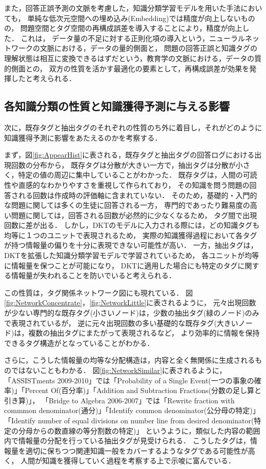 また，回答正誤予測の文脈を考慮した，知識分類学習モデルを用いた手法においても，
単純な低次元空間への埋め込み(Embedding)では精度が向上しないものの，
問題空間とタグ空間の再構成誤差を導入することにより，精度が向上した．
これは，
データ量の不足に対する正則化項の導入という，ニューラルネットワークの文脈における，データの量的側面と，
問題の回答正誤と知識タグの理解状態は相互に変換できるはずだという，教育学の文脈における，データの質的側面との，
双方の性質を活かす最適化の要素として，再構成誤差が効果を発揮したと考えられる．



\subsection{各知識分類の性質と知識獲得予測に与える影響}
次に，既存タグと抽出タグのそれぞれの性質のち外に着目し，それがどのように知識獲得予測に影響をあたえるのかを考察する．

まず，図\ref{fig:AppearHist}に表される，既存タグと抽出タグの回答ログにおける出現回数の分布から，
既存タグは分散が大きい一方で，抽出タグは分散が小さく，特定の値の周辺に集中していることがわかった．
既存タグは，人間の可読性や直感的なわかりやすさを重視して作られており，
その知識を問う問題の回答される回数は作成時の評価軸に含まれていない．
そのため，基礎的・入門的な問題に関しては多くの生徒に回答される一方，
専門的であったり難易度の高い問題に関しては，回答される回数が必然的に少なくなるため，
タグ間で出現回数に差が出る．
しかし，DKTのモデルに入力される際には，どの知識タグも均等に１つのユニットで表現されるため，
実際の知識獲得過程において各タグが持つ情報量の偏りを十分に表現できない可能性が高い．
一方，抽出タグは，DKTを拡張した知識分類学習モデルで学習されているため，
各ユニットが均等に情報量を保つことが可能になり，
DKTに適用した場合にも特定のタグに関する情報量が失われることを防いでいると考えられる．

この性質は，タグ関係ネットワーク図にも現れている．
図\ref{fig:NetworkConcentrate}，\ref{fig:NetworkLittle}に表されるように，
元々出現回数が少ない専門的な既存タグ(小さいノード)は，少数の抽出タグ(緑のノード)のみで表現されているが，
逆に元々出現回数の多い基礎的な既存タグ(大きいノード)は，複数の抽出タグにまたがって表現されるなど，
より効率的に情報を保持できるタグ構造がとなっていることがわかる．

さらに，こうした情報量の均等な分配構造は，内容と全く無関係に生成されるものではないこともわかる．
図\ref{fig:NetworkSimilar}に表されるように，
「ASSISTments 2009-2010」では「Probability of a Single Event(一つの事象の確率)」「Percent Of(百分率)」「Addition and Subtraction Fractions(分数の足し算と引き算)」，
「Bridge to Algebra 2006-2007」では「Rewrite fraction with commmon denominator(通分)」「Identify common denominator(公分母の特定)」「Identify number of equal divisions on number line from desired denominator(特定の分母からの数直線の等分割数の特定)」
というように，類似した内容の範囲内で情報量の分配を行っている抽出タグが見受けられる．
こうしたタグは，情報量を適切に保ちつつ関連知識一般をカバーするようなタグである可能性が高く，
人間が知識を獲得していく過程を考察する上で示唆に富んでいる．



